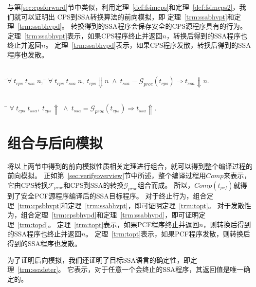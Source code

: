 与第\ref{sec:cpsforward}节中类似，利用定理~\ref{def:fsimcps}和定理~\ref{def:fsimcps2}，我们就可以证明出
CPS到SSA转换算法的前向模拟，即
定理~\ref{trm:ssabhvpt}和定理~\ref{trm:ssabhvpd}。
转换得到的SSA程序会保存安全的CPS源程序具有的行为。
定理~\ref{trm:ssabhvpt}表示，如果CPS程序终止并返回$n$，转换后得到的SSA程序也终止并返回$n$。
定理~\ref{trm:ssabhvpd}表示，如果CPS程序发散，转换后得到的SSA程序也发散。

\begin{theorem}[SSA程序对CPS程序终止行为的保存]\label{trm:ssabhvpt} 
    \begin{tabbing}
     \\
    \quad\=$\forall \; t_{cps}\; t_{ssa}\; n,\; $\=\kill
    \>$\forall \; t_{cps}\; t_{ssa}\; n,\; t_{cps}\Downarrow n\; \wedge \; t_{ssa}=\mathcal{G}_{proc}(t_{cps}) \Longrightarrow t_{ssa}\Downarrow n.$
    \end{tabbing}
  \end{theorem}
  
  \begin{theorem}[SSA程序对CPS程序发散行为的保存]\label{trm:ssabhvpd}
    \begin{tabbing}
      \\
    \quad\=\kill
    \>$\forall \; t_{cps}\; t_{ssa},\; t_{cps}\Uparrow\; \wedge \; t_{ssa}=\mathcal{G}_{proc}(t_{cps})\Longrightarrow t_{ssa}\Uparrow.$
    \end{tabbing}
  \end{theorem}

\section{组合与后向模拟} \label{sec:combback}

将以上两节中得到的前向模拟性质相关定理进行组合，就可以得到整个编译过程的前向模拟。
正如第~\ref{sec:verifyoverview}节中所述，整个编译过程用$Comp$来表示，
它由CPS转换$\mathcal{F}_{proc}$和CPS到SSA的转换$\mathcal{G}_{proc}$组合而成。
所以，$Comp(t_{pcf})$就得到了安全PCF源程序编译后的SSA目标程序。
对于终止行为，组合定理~\ref{trm:cpsbhvpt}和定理~\ref{trm:ssabhvpt}，即可证明定理~\ref{trm:topt}。
对于发散性为，组合定理~\ref{trm:cpsbhvpd}和定理~\ref{trm:ssabhvpd}，即可证明定理~\ref{trm:topd}。
定理~\ref{trm:topt}表示，如果PCF程序终止并返回$n$，则转换后得到的SSA程序也终止并返回$n$。
定理~\ref{trm:topt}表示，如果PCF程序发散，则转换后得到的SSA程序也发散。

为了证明后向模拟，我们还证明了目标SSA语言的确定性，即定理~\ref{trm:ssadeter}。
它表示，对于任意一个会终止的SSA程序，其返回值是唯一确定的。

